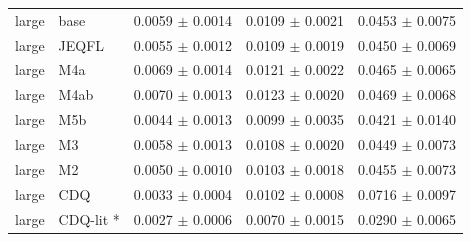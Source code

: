 \begin{table}[t]
\begin{tabular}{lllll}
large & base & 0.0059 $\pm$ 0.0014 & 0.0109 $\pm$ 0.0021 & 0.0453 $\pm$ 0.0075 \\
large & JEQFL & 0.0055 $\pm$ 0.0012 & 0.0109 $\pm$ 0.0019 & 0.0450 $\pm$ 0.0069 \\
large & M4a & 0.0069 $\pm$ 0.0014 & 0.0121 $\pm$ 0.0022 & 0.0465 $\pm$ 0.0065 \\
large & M4ab & 0.0070 $\pm$ 0.0013 & 0.0123 $\pm$ 0.0020 & 0.0469 $\pm$ 0.0068 \\
large & M5b & 0.0044 $\pm$ 0.0013 & 0.0099 $\pm$ 0.0035 & 0.0421 $\pm$ 0.0140 \\
large & M3 & 0.0058 $\pm$ 0.0013 & 0.0108 $\pm$ 0.0020 & 0.0449 $\pm$ 0.0073 \\
large & M2 & 0.0050 $\pm$ 0.0010 & 0.0103 $\pm$ 0.0018 & 0.0455 $\pm$ 0.0073 \\
large & CDQ & 0.0033 $\pm$ 0.0004 & 0.0102 $\pm$ 0.0008 & 0.0716 $\pm$ 0.0097 \\
large & CDQ-lit * & 0.0027 $\pm$ 0.0006 & 0.0070 $\pm$ 0.0015 & 0.0290 $\pm$ 0.0065 \\
\bottomrule
\end{tabular}
\end{table}